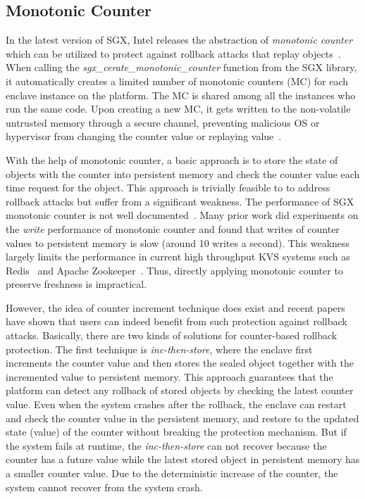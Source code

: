 

\subsection{Monotonic Counter}

In the latest version of SGX, Intel releases the abstraction of \textit{monotonic counter} which can be utilized to 
protect against rollback attacks that replay objects~\cite{}. When calling the 
\textit{sgx\_cerate\_monotonic\_counter} function from the SGX library, it automatically creates a 
limited number of monotonic counters (MC) for each enclave instance on the platform. The MC is shared 
among all the instances who run the same code. Upon creating a new MC, it gets written to the non-volatile
untrusted memory through a secure channel, preventing malicious OS or hypervisor from changing the counter 
value or replaying value~\cite{}.

With the help of monotonic counter, a basic approach is to store
the state of objects with the counter into persistent memory and check the counter value 
each time request for the object. This approach is trivially feasible to to address 
rollback attacks but suffer from a significant weakness. The performance of SGX monotonic 
counter is not well documented~\cite{}. Many prior work did experiments on the \textit{write}
performance of monotonic counter and found that writes of counter values to persistent
memory is slow (around 10 writes a second). This weakness largely limits the performance in 
current high throughput KVS systems such as Redis~\cite{} and Apache Zookeeper~\cite{}.
Thus, directly applying monotonic counter to preserve freshness is impractical.

However, the idea of counter increment technique does exist and recent papers~\cite{} have 
shown that users can indeed benefit from such protection against rollback attacks.
Basically, there are two kinds of solutions for counter-based rollback protection.
The first technique is \textit{inc-then-store}, where the enclave first increments the counter
value and then stores the sealed object together with the incremented value 
to persistent memory. This approach guarantees that the platform can detect any rollback 
of stored objects by checking the latest counter value. Even when the system crashes after 
the rollback, the enclave can restart and check the counter value in the persistent memory,
and restore to the updated state (value) of the counter without breaking the protection mechanism.
But if the system fails at runtime, the \textit{inc-then-store} can not recover because 
the counter has a future value while the latest stored object in persistent memory has a smaller 
counter value. Due to the deterministic increase of the counter, the system cannot recover from 
the system crash.


